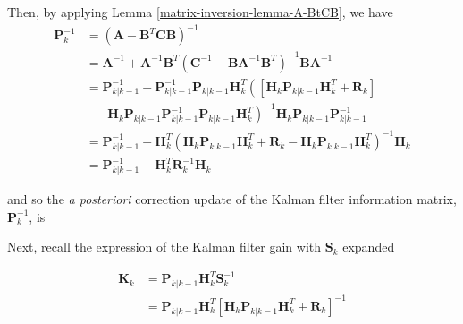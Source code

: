 Then, by applying Lemma \ref{matrix-inversion-lemma-A-BtCB}, we have
\begin{equation*}
    \begin{aligned}
        \mathbf{P}_k^{-1}
        &= \left( \mathbf{A} - \mathbf{B}^T \mathbf{C} \mathbf{B} \right)^{-1} \\
        &= \mathbf{A}^{-1} + \mathbf{A}^{-1} \mathbf{B}^T \left( \mathbf{C}^{-1} - \mathbf{B} \mathbf{A}^{-1} \mathbf{B}^T \right)^{-1} \mathbf{B} \mathbf{A}^{-1} \\
        &= \mathbf{P}_{k|k-1}^{-1} + \mathbf{P}_{k|k-1}^{-1} \mathbf{P}_{k|k-1} \mathbf{H}_k^T
        \left( \left[ \mathbf{H}_k \mathbf{P}_{k|k-1} \mathbf{H}_k^T + \mathbf{R}_k \right] \right. \\
        & \phantom{M} \left. - \mathbf{H}_k \mathbf{P}_{k|k-1} \mathbf{P}_{k|k-1}^{-1} \mathbf{P}_{k|k-1} \mathbf{H}_k^T \right)^{-1}
        \mathbf{H}_k \mathbf{P}_{k|k-1} \mathbf{P}_{k|k-1}^{-1} \\
        &= \mathbf{P}_{k|k-1}^{-1} + \mathbf{H}_k^T
        \left( \mathbf{H}_k \mathbf{P}_{k|k-1} \mathbf{H}_k^T + \mathbf{R}_k - \mathbf{H}_k \mathbf{P}_{k|k-1} \mathbf{H}_k^T \right)^{-1}
        \mathbf{H}_k \\
        &= \mathbf{P}_{k|k-1}^{-1} + \mathbf{H}_k^T \mathbf{R}_k^{-1} \mathbf{H}_k
    \end{aligned}
\end{equation*}

and so the \textit{a posteriori} correction update of the Kalman filter information matrix,
$\mathbf{P}_k^{-1}$, is


Next, recall the expression of the Kalman filter gain with $\mathbf{S}_k$ expanded

\begin{equation*}
    \begin{aligned}
        \mathbf{K}_k &= \mathbf{P}_{k|k-1} \mathbf{H}_k^T \mathbf{S}_k^{-1} \\
        &= \mathbf{P}_{k|k-1} \mathbf{H}_k^T \left[ \mathbf{H}_k \mathbf{P}_{k|k-1} \mathbf{H}_k^T + \mathbf{R}_k \right]^{-1}
    \end{aligned}
\end{equation*}

